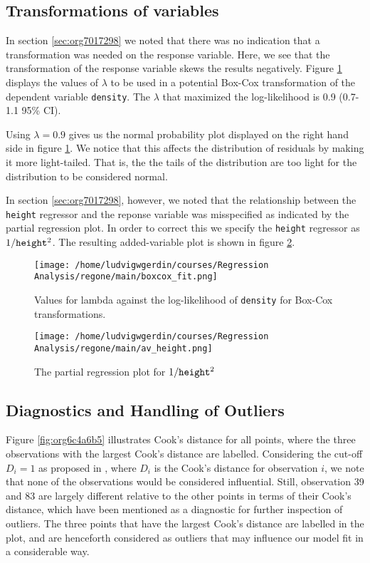 \documentclass[11pt]{article}
\begin{document}
\subsection{Transformations of variables}
\label{sec:org12d97c4}

In section \ref{sec:org7017298} we noted that there was no indication that a transformation was needed on the 
response variable. Here, we see that the transformation of the response variable skews the results negatively.
Figure \ref{fig:org787b68d} displays the values of \(\lambda\) to be used in a potential Box-Cox transformation of 
the dependent variable \texttt{density}. The \(\lambda\) that maximized the log-likelihood is 0.9 (0.7-1.1 95\% CI). 

Using \(\lambda = 0.9\) gives us the normal probability plot displayed on the right hand side in figure \ref{fig:org787b68d}.
We notice that this affects the distribution of residuals by making it more light-tailed. That is, the 
the tails of the distribution are too light for the distribution to be considered normal.

In section \ref{sec:org7017298}, however, we noted that the relationship between the \texttt{height} regressor 
and the reponse variable was misspecified as indicated by the partial regression plot. In order to correct 
this we specify the \texttt{height} regressor as \(1/\text{\texttt{height}}^2\). The resulting added-variable
plot is shown in figure \ref{fig:orgbf5d971}.

\begin{figure}[h]
\centering
\texttt{[image: /home/ludvigwgerdin/courses/Regression Analysis/regone/main/boxcox\_fit.png]}
\caption{\label{fig:org787b68d}
Values for lambda against the log-likelihood of \texttt{density} for Box-Cox transformations.}
\end{figure}

\begin{figure}[h]
\centering
\texttt{[image: /home/ludvigwgerdin/courses/Regression Analysis/regone/main/av\_height.png]}
\caption{\label{fig:orgbf5d971}
The partial regression plot for \(1/\text{\texttt{height}}^2\)}
\end{figure}

\subsection{Diagnostics and Handling of Outliers}
\label{sec:orgedd6e5b}

Figure \ref{fig:org6c4a6b5} illustrates Cook's distance for all points, where the three observations with the largest 
Cook's distance are labelled. Considering the cut-off \(D_i = 1\) as proposed in \cite{Montgomery2012}, 
where \(D_i\) is the Cook's distance for observation \(i\), we note that none of the observations would be 
considered influential. Still, observation 39 and 83 are largely different relative
to the other points in terms of their Cook's distance, which have been mentioned as a diagnostic for further
inspection of outliers. \cite{Fox1991} The three points that have the largest Cook's distance are labelled
in the plot, and are henceforth considered as outliers that may influence our model fit in a considerable way.
\end{document}
